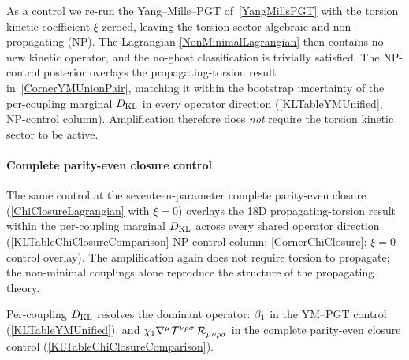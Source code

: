 As a control we re-run the Yang--Mills--PGT of~\cref{YangMillsPGT}
with the torsion kinetic coefficient $\xi$ zeroed, leaving the
torsion sector algebraic and non-propagating (NP). The Lagrangian
\cref{NonMinimalLagrangian} then contains no new kinetic operator,
and the no-ghost classification
is trivially satisfied. The NP-control posterior overlays the
propagating-torsion result in~\cref{CornerYMUnionPair}, matching it
within the bootstrap uncertainty of the per-coupling marginal $D_\mathrm{KL}$
in every operator direction (\cref{KLTableYMUnified}, NP-control
column). Amplification therefore does \emph{not} require the torsion
kinetic sector to be active.

\paragraph*{Complete parity-even closure control}
The same control at the seventeen-parameter complete parity-even
closure (\cref{ChiClosureLagrangian}
with $\xi = 0$) overlays the 18D propagating-torsion result within
the per-coupling marginal $D_\mathrm{KL}$ across every shared operator
direction (\cref{KLTableChiClosureComparison} NP-control column;
\cref{CornerChiClosure}: $\xi=0$ control overlay). The
amplification again does not require torsion to propagate; the
non-minimal couplings alone reproduce the structure of the
propagating theory.

Per-coupling $D_\mathrm{KL}$ resolves the dominant
operator: $\beta_{1}$ in the YM--PGT control
(\cref{KLTableYMUnified}), and
$\chi_1\rcD{^\mu}\MAGT{^{\nu\rho\sigma}}\,\MAGF{_{\mu\nu\rho\sigma}}$
in the complete parity-even closure control
(\cref{KLTableChiClosureComparison}).


